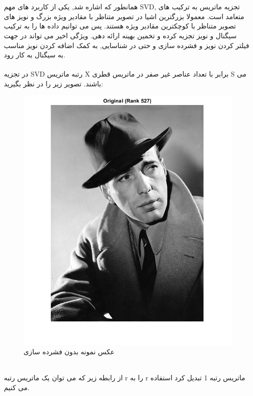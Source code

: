 \documentclass[12pt]{tehranReport}
\begin{document}
\section{}
همانطور که اشاره شد, یکی از کاربرد های مهم SVD, تجزیه ماتریس به ترکیب های متعامد است. معمولا بزرگترین اشیا در تصویر متناظر با مقادیر ویژه بزرگ و نویز های تصویر متناظر با کوچکترین مقادیر ویژه هستند. پس می توانیم داده ها را به ترکیب سیگنال و نویز تجزیه کرده و تخمین بهینه ارائه دهی. ویژگی اخیر می تواند در جهت فیلتر کردن نویز و فشرده سازی و حتی در شناسایی, به کمک اضافه کردن نویز مناسب به سیگنال به کار رود.
\\\\
	در تجزیه SVD رتبه ماتریس X برابر با تعداد عناصر غیر صفر در ماتریس قطری S می باشند. تصویر زیر را در نظر بگیرید:
	\begin{figure}[h!]
		\centering
		\includegraphics[width=\linewidth, height=.35\textheight,keepaspectratio]{pics/3}
		\caption{ عکس نمونه بدون فشرده سازی}
	\end{figure}\\
	از رابطه زیر که می توان یک ماتریس رتبه r را به r ماتریس رتبه 1 تبدیل کرد استفاده می کنیم.
\end{document}
